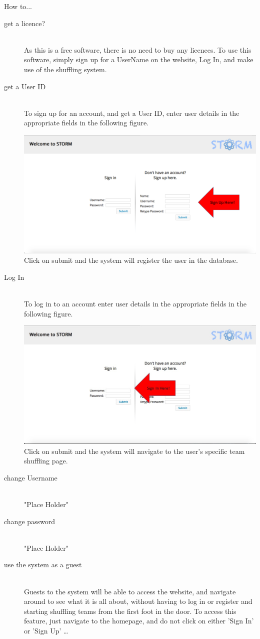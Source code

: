 How to...

\begin{description}
 	\item[get a licence?] \hfill \\
 		As this is a free software, there is no need to buy any licences. To use this software, simply 
		sign up for a UserName on the website, Log In, and make use of the shuffling system.
 	\item[get a User ID] \hfill \\
		To sign up for an account, and get a User ID, enter user details in the appropriate fields in the 		following figure.\par
   		 \includegraphics[width=13cm]{./graphics/StormUMSU1.jpg}
   		Click on submit and the system will register the user in the database.
	\item[Log In] \hfill \\
 		To log in to an account enter user details in the appropriate fields in the following figure.\par
   		 \includegraphics[width=13cm]{./graphics/StormUMSU2.jpg}
   		Click on submit and the system will navigate to the user's specific team shuffling page.
    	\item[change Username] \hfill \\
 		"Place Holder"
	\item[change password] \hfill \\
 		"Place Holder"
	\item[use the system as a guest] \hfill \\
 		Guests to the system will be able to access the website, and navigate around to see what it
		is all about, without having to log in or register and starting shuffling teams from the first foot in 		the door. To access this feature, just navigate to the homepage, and do not click on either 		'Sign In' or 'Sign Up'  \ldots
\end{description}